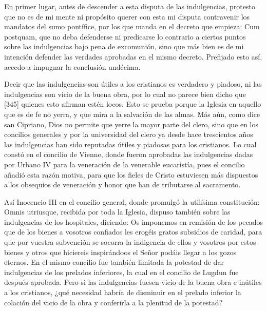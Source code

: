 En primer lugar, antes de descender a esta disputa de las indulgencias, protesto que no es de mi mente ni propósito querer con esta mi disputa contravenir los mandatos del sumo pontífice, por los que manda en el decreto que empieza: Cum postquam, que no deba defenderse ni predicarse lo contrario a ciertos puntos sobre las indulgencias bajo pena de excomunión, sino que más bien es de mi intención defender las verdades aprobadas en el mismo decreto. Prefijado esto así, accedo a impugnar la conclusión undécima.

Decir que las indulgencias son útiles a los cristianos es verdadero y piadoso, ni las indulgencias son vicio de la buena obra, por lo cual no parece bien dicho que [345] quienes esto afirman estén locos. Esto se prueba porque la Iglesia en aquello que es de fe no yerra, y que mira a la salvación de las almas. Más aún, como dice san Cipriano, Dios no permite que yerre la mayor parte del clero, sino que en los concilios generales y por la universidad del clero ya desde hace trescientos años las indulgencias han sido reputadas útiles y piadosas para los cristianos. Lo cual constó en el concilio de Vienne, donde fueron aprobadas las indulgencias dadas por Urbano IV para la veneración de la venerable eucaristía, pues el concilio añadió esta razón motiva, para que los fieles de Cristo estuviesen más dispuestos a los obsequios de veneración y honor que han de tributarse al sacramento.

Así Inocencio III en el concilio general, donde promulgó la utilísima constitución: Omnis utriusque, recibida por toda la Iglesia, dispuso también sobre las indulgencias de los hospitales, diciendo: Os imponemos en remisión de los pecados que de los bienes a vosotros confiados les erogéis gratos subsidios de caridad, para que por vuestra subvención se socorra la indigencia de ellos y vosotros por estos bienes y otros que hiciereis inspirándoos el Señor podáis llegar a los gozos eternos. En el mismo concilio fue también limitada la potestad de dar indulgencias de los prelados inferiores, la cual en el concilio de Lugdun fue después aprobada. Pero si las indulgencias fuesen vicio de la buena obra e inútiles a los cristianos, ¿qué necesidad habría de disminuir en el prelado inferior la colación del vicio de la obra y conferirla a la plenitud de la potestad?

